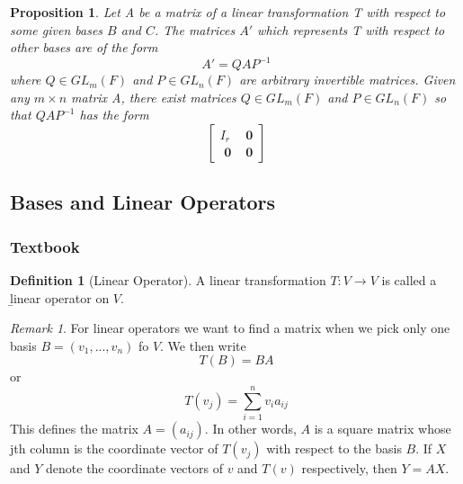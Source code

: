 \documentclass[12pt]{article}
\newtheorem{prop}[thm]{Proposition}
\theoremstyle{definition}
\newtheorem{defn}[thm]{Definition}
\theoremstyle{remark}
\newtheorem{rmk}[thm]{Remark}
\numberwithin{equation}{section}
\newcommand\B[1]{\textbf{ #1}}
\begin{document}
\vspace{15pt}


\begin{prop}
        Let A be a matrix of a linear transformation T with respect to some given bases $B$ and $C$. The matrices $A'$ which represents T with respect to other bases are of the form \begin{equation}
                A' = QAP^{-1}
        \end{equation}
        where $Q \in GL_m(F)$ and $P \in GL_n(F)$ are arbitrary invertible matrices. Given any $m\times n$ matrix A, there exist matrices $Q \in GL_m(F)$ and $P \in GL_n(F)$ so that $QAP^{-1}$ has the form \begin{equation}
                \left[\begin{array}{c|c} I_r & \B{0} \\ \hline \B{0} & \B{0} \end{array}\right]
        \end{equation}
\end{prop}


\vspace{15pt}




\subsection{Bases and Linear Operators}


\subsubsection{Textbook}

\begin{defn}[Linear Operator]
        A linear transformation $T: V\rightarrow V$ is called a \b{linear operator} on $V$.
\end{defn}

\vspace{15pt}

\begin{rmk}
        For linear operators we want to find a matrix when we pick only one basis $B = (v_1,...,v_n)$ fo $V$. We then write \begin{equation}
                T(B) = BA
        \end{equation}
        or \begin{equation}
                T(v_j) = \sum\limits_{i=1}^nv_ia_{ij}
        \end{equation}
        This defines the matrix $A = (a_{ij})$. In other words, $A$ is a square matrix whose jth column is the coordinate vector of $T(v_j)$ with respect to the basis $B$. If $X$ and $Y$ denote the coordinate vectors of $v$ and $T(v)$ respectively, then $Y = AX$.
\end{rmk}
\end{document}
